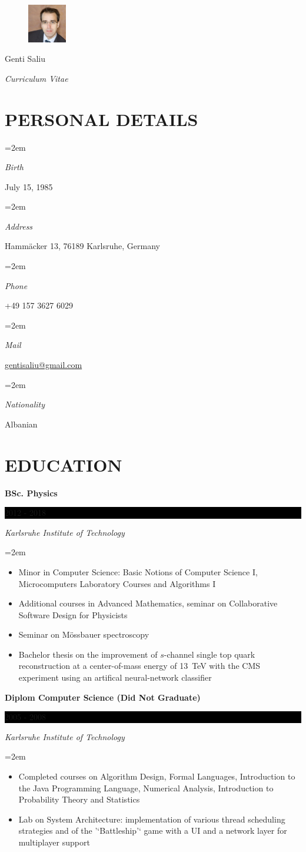 \documentclass[paper=a4,fontsize=11pt]{scrartcl} %
\newlength{\spacebox}
\newcommand{\sepspace}{\vspace*{1em}}		%
\newcommand{\MyName}[1]{ %
		\Huge \usefont{OT1}{phv}{b}{n} \hfill #1
		\par \normalsize \normalfont}
\newcommand{\MySlogan}[1]{ %
		\large \usefont{OT1}{phv}{m}{n}\hfill \textit{#1}
		\par \normalsize \normalfont}
\newcommand{\NewPart}[1]{\section*{\uppercase{#1}}}
\newcommand{\PersonalEntry}[2]{
		\noindent\hangindent=2em\hangafter=0 %
		\parbox{\spacebox}{        %
		\textit{#1}}		       %
		\hspace{1.5em} #2 \par}    %
\newcommand{\EducationEntry}[4]{
		\noindent \textbf{#1} \hfill      %
		\colorbox{Black}{%
			\parbox{6em}{%
			\hfill\color{White}#2}} \par  %
		\noindent \textit{#3} \par        %
		\noindent\hangindent=2em\hangafter=0 \small #4 %
		\normalsize \par}
\begin{document}
\begin{figure}
	\vspace*{-2em}
	\includegraphics[width=0.15\textwidth]{photo.jpeg}
\end{figure}

\MyName{Genti Saliu}
\MySlogan{Curriculum Vitae}

\sepspace

\NewPart{Personal details}{}

\PersonalEntry{Birth}{July 15, 1985}
\PersonalEntry{Address}{Hammäcker 13, 76189 Karlsruhe, Germany}
\PersonalEntry{Phone}{+49 157 3627 6029}
\PersonalEntry{Mail}{\url{gentisaliu@gmail.com}}
\PersonalEntry{Nationality}{Albanian}

\NewPart{Education}{}

\EducationEntry{BSc. Physics}{2012 - 2018}{Karlsruhe Institute of Technology}{
\begin{itemize}
    \item Minor in Computer Science: Basic Notions of Computer Science I, Microcomputers Laboratory Courses and Algorithms I
    \item Additional courses in Advanced Mathematics, seminar on Collaborative Software Design for Physicists
    \item Seminar on Mössbauer spectroscopy
    \item Bachelor thesis on the improvement of $s$-channel single top quark reconstruction at a center-of-mass energy of \SI{13}{TeV} with the CMS experiment using an artifical neural-network classifier
\end{itemize}}
\sepspace

\EducationEntry{Diplom Computer Science (Did Not Graduate)}{2005 - 2008}{Karlsruhe Institute of Technology}{
\begin{itemize}
    \item Completed courses on Algorithm Design, Formal Languages, Introduction to the Java Programming Language, Numerical Analysis, Introduction to Probability Theory and Statistics
    \item Lab on System Architecture: implementation of various thread scheduling strategies and of the ’‘Battleship’‘ game with a UI and a network layer for multiplayer support
\end{itemize}}
\sepspace
\end{document}
